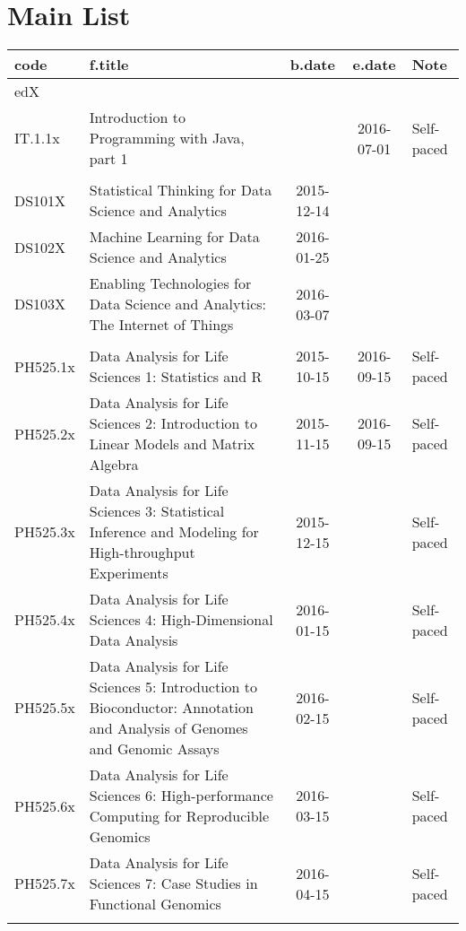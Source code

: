\documentclass[a4paper,12pt]{article} %
\begin{document}
\tableofcontents

\newpage
\section{Main List}
\begin{longtable}{|l|p{6cm}|c|c|l|}
	\hline
	code & f.title & b.date & e.date & Note \\
	\hline
	\multicolumn{5}{|l|}{edX}\\
	\hline
	IT.1.1x & Introduction to Programming with Java, part 1 &  & 2016-07-01 & Self-paced\\
	\hline
	&  &  &  &  \\
	\hline
	DS101X & Statistical Thinking for Data Science and Analytics & 2015-12-14 &  &  \\
	\hline
	DS102X & Machine Learning for Data Science and Analytics & 2016-01-25 &  &  \\
	\hline
	DS103X & Enabling Technologies for Data Science and Analytics: The Internet of Things &  2016-03-07 &  &  \\
	\hline
	&  &  &  &  \\
	\hline
	PH525.1x & Data Analysis for Life Sciences 1: Statistics and R & 2015-10-15 & 2016-09-15 & Self-paced \\
	\hline
	PH525.2x & Data Analysis for Life Sciences 2: Introduction to Linear Models and Matrix Algebra & 2015-11-15 & 2016-09-15 & Self-paced \\
	\hline
	PH525.3x & Data Analysis for Life Sciences 3: Statistical Inference and Modeling for High-throughput Experiments & 2015-12-15 &  & Self-paced \\
	\hline
	PH525.4x & Data Analysis for Life Sciences 4: High-Dimensional Data Analysis & 2016-01-15 &  & Self-paced \\
	\hline
	PH525.5x & Data Analysis for Life Sciences 5: Introduction to Bioconductor: Annotation and Analysis of Genomes and Genomic Assays & 2016-02-15 &  & Self-paced \\
	\hline
	PH525.6x & Data Analysis for Life Sciences 6: High-performance Computing for Reproducible Genomics & 2016-03-15 &  & Self-paced \\
	\hline
	PH525.7x & Data Analysis for Life Sciences 7: Case Studies in Functional Genomics & 2016-04-15 &  & Self-paced \\
	\hline
	&  &  &  &  \\

\end{longtable}
\end{document}
